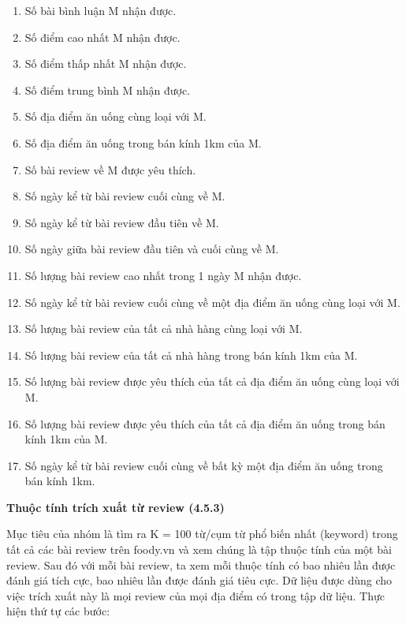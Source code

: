 \documentclass[12pt]{extarticle}
\begin{document}
				\begin{enumerate}
					\item Số bài bình luận M nhận được.
					\item Số điểm cao nhất M nhận được.
					\item Số điểm thấp nhất M nhận được.
					\item Số điểm trung bình M nhận được.
					\item Số địa điểm ăn uống cùng loại với M.
					\item Số địa điểm ăn uống trong bán kính 1km của M.
					\item Số bài review về M được yêu thích.
					\item Số ngày kể từ bài review cuối cùng về M. 
					\item Số ngày kể từ bài review đầu tiên về M.
					\item Số ngày giữa bài review đầu tiên và cuối cùng về M. 
					\item Số lượng bài review cao nhất trong 1 ngày M nhận được.
					\item Số ngày kể từ bài review cuối cùng về một địa điểm ăn uống cùng loại với M.
					\item Số lượng bài review của tất cả nhà hàng cùng loại với M.
					\item Số lượng bài review của tất cả nhà hàng trong bán kính 1km của M.	
					\item Số lượng bài review được yêu thích của tất cả địa điểm ăn uống cùng loại với M.
					\item Số lượng bài review được yêu thích của tất cả địa điểm ăn uống trong bán kính 1km của M.
					\item Số ngày kể từ bài review cuối cùng về bất kỳ một địa điểm ăn uống trong bán kính 1km.
				\end{enumerate}
			\par \textbf{Thuộc tính trích xuất từ review (4.5.3)}
				\par Mục tiêu của nhóm là tìm ra K = 100 từ/cụm từ phổ biến nhất (keyword) trong tất cả các bài review trên foody.vn và  xem chúng là tập thuộc tính của một bài review. Sau đó với mỗi bài review, ta xem mỗi thuộc tính có bao nhiêu lần được đánh giá tích cực, bao nhiêu lần được đánh giá tiêu cực. Dữ liệu được dùng cho việc trích xuất này là mọi review của mọi địa điểm có trong tập dữ liệu. Thực hiện thứ tự các bước:
\end{document}
